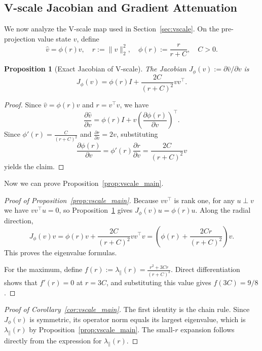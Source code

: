 \documentclass{article}
\theoremstyle{plain}
\newtheorem{proposition}{Proposition}
\theoremstyle{definition}
\theoremstyle{remark}
\begin{document}
\subsection{V-scale Jacobian and Gradient Attenuation}\label{app:theory:vscale}
We now analyze the V-scale map used in Section~\ref{sec:vscale}. On the pre-projection value state $v$, define
\[
    \hat{v} = \phi(r) v,
    \quad
    r := \|v\|_2^2,
    \quad
    \phi(r) := \frac{r}{r+C},
    \quad
    C>0.
\]

\begin{proposition}[Exact Jacobian of V-scale]\label{prop:vscale-jac-app}
The Jacobian $J_\phi(v) := \partial \hat{v} / \partial v$ is
\[
    J_\phi(v) = \phi(r) I + \frac{2C}{(r+C)^2} vv^\top.
\]
\end{proposition}

\begin{proof}
Since $\hat{v} = \phi(r)v$ and $r = v^\top v$, we have
\[
    \frac{\partial \hat{v}}{\partial v}
    = \phi(r)I + v\left(\frac{\partial \phi(r)}{\partial v}\right)^\top.
\]
Since $\phi'(r) = \frac{C}{(r+C)^2}$ and $\frac{\partial r}{\partial v} = 2v$, 
substituting
\[
    \frac{\partial \phi(r)}{\partial v} = \phi'(r)\frac{\partial r}{\partial v} = \frac{2C}{(r+C)^2}v
\]
yields the claim.
\end{proof}

Now we can prove Proposition~\ref{prop:vscale_main}.
\begin{proof}[Proof of Proposition~\ref{prop:vscale_main}]
Because $vv^\top$ is rank one, for any $u\perp v$ we have $vv^\top u = 0$, so Proposition~\ref{prop:vscale-jac-app} gives $J_\phi(v)u = \phi(r)u$. Along the radial direction,
\[
    J_\phi(v)v = \phi(r)v + \frac{2C}{(r+C)^2}vv^\top v = \left(\phi(r) + \frac{2Cr}{(r+C)^2}\right)v.
\]
This proves the eigenvalue formulas.

For the maximum, define $f(r) := \lambda_\parallel(r) = \frac{r^2+3Cr}{(r+C)^2}$.
Direct differentiation shows that $f'(r)=0$ at $r=3C$, and substituting this value gives $f(3C)=9/8$.
\end{proof}

\begin{proof}[Proof of Corollary~\ref{cor:vscale_main}]
The first identity is the chain rule. Since $J_\phi(v)$ is symmetric, its operator norm equals its largest eigenvalue, which is $\lambda_\parallel(r)$ by Proposition~\ref{prop:vscale_main}. The small-$r$ expansion follows directly from the expression for $\lambda_\parallel(r)$.
\end{proof}
\end{document}
